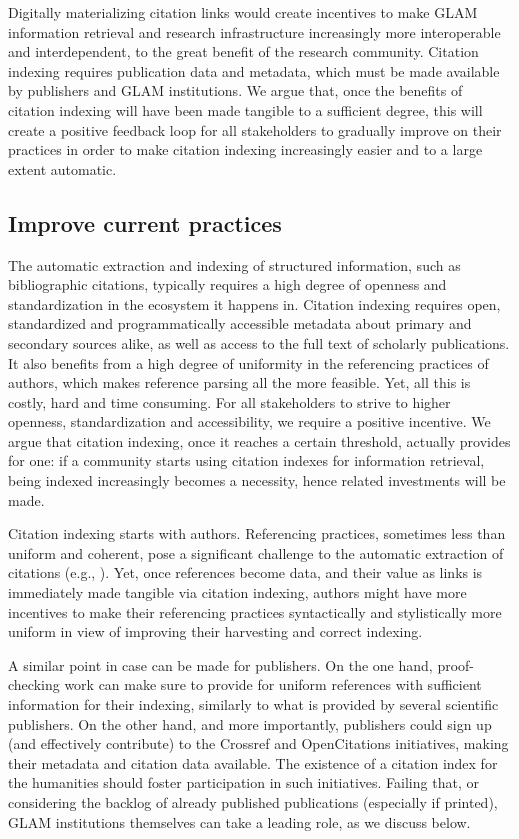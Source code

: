 Digitally materializing citation links would create incentives to make GLAM information retrieval and research infrastructure increasingly more interoperable and interdependent, to the great benefit of the research community. Citation indexing requires publication data and metadata, which must be made available by publishers and GLAM institutions. We argue that, once the benefits of citation indexing will have been made tangible to a sufficient degree, this will create a positive feedback loop for all stakeholders to gradually improve on their practices in order to make citation indexing increasingly easier and to a large extent automatic.

\subsection{Improve current practices}
The automatic extraction and indexing of structured information, such as bibliographic citations, typically requires a high degree of openness and standardization in the ecosystem it happens in. Citation indexing requires open, standardized and programmatically accessible metadata about primary and secondary sources alike, as well as access to the full text of scholarly publications. It also benefits from a high degree of uniformity in the referencing practices of authors, which makes reference parsing all the more feasible. Yet, all this is costly, hard and time consuming. For all stakeholders to strive to higher openness, standardization and accessibility, we require a positive incentive. We argue that citation indexing, once it reaches a certain threshold, actually provides for one: if a community starts using citation indexes for information retrieval, being indexed increasingly becomes a necessity, hence related investments will be made.
 
Citation indexing starts with authors. Referencing practices, sometimes less than uniform and coherent, pose a significant challenge to the automatic extraction of citations (e.g., \cite{nederhof_bibliometric_2006}). Yet, once references become data, and their value as links is immediately made tangible via citation indexing, authors might have more incentives to make their referencing practices syntactically and stylistically more uniform in view of improving their harvesting and correct indexing.%
 
A similar point in case can be made for publishers. On the one hand, proof-checking work can make sure to provide for uniform references with sufficient information for their indexing, similarly to what is provided by several scientific publishers. On the other hand, and more importantly, publishers could sign up (and effectively contribute) to the Crossref and OpenCitations initiatives, making their metadata and citation data available. The existence of a citation index for the humanities should foster participation in such initiatives. Failing that, or considering the backlog of already published publications (especially if printed), GLAM institutions themselves can take a leading role, as we discuss below.
 
